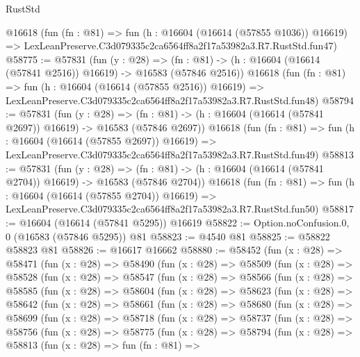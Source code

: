\begin{lexlean}{RustStd}
\begin{coremodule}
    @16618
    (fun (fn : @81) =>
    fun (h : @16604 (@16614 (@57855 @1036)) @16619) =>
    LexLeanPreserve.C3d079335c2ca6564ff8a2f17a53982a3.R7.RustStd.fun47)
@58775 := @57831
    (fun (y : @28) =>
    (fn : @81) -> (h : @16604 (@16614 (@57841 @2516)) @16619) -> @16583 (@57846 @2516))
    @16618
    (fun (fn : @81) =>
    fun (h : @16604 (@16614 (@57855 @2516)) @16619) =>
    LexLeanPreserve.C3d079335c2ca6564ff8a2f17a53982a3.R7.RustStd.fun48)
@58794 := @57831
    (fun (y : @28) =>
    (fn : @81) -> (h : @16604 (@16614 (@57841 @2697)) @16619) -> @16583 (@57846 @2697))
    @16618
    (fun (fn : @81) =>
    fun (h : @16604 (@16614 (@57855 @2697)) @16619) =>
    LexLeanPreserve.C3d079335c2ca6564ff8a2f17a53982a3.R7.RustStd.fun49)
@58813 := @57831
    (fun (y : @28) =>
    (fn : @81) -> (h : @16604 (@16614 (@57841 @2704)) @16619) -> @16583 (@57846 @2704))
    @16618
    (fun (fn : @81) =>
    fun (h : @16604 (@16614 (@57855 @2704)) @16619) =>
    LexLeanPreserve.C3d079335c2ca6564ff8a2f17a53982a3.R7.RustStd.fun50)
@58817 := @16604 (@16614 (@57841 @5295)) @16619
@58822 := Option.noConfusion.{0, 0} (@16583 (@57846 @5295)) @81
@58823 := @4540 @81
@58825 := @58822 @58823 @81
@58826 := @16617 @16662
@58880 := @58452
    (fun (x : @28) =>
    @58471
      (fun (x : @28) =>
      @58490
        (fun (x : @28) =>
        @58509
          (fun (x : @28) =>
          @58528
            (fun (x : @28) =>
            @58547
              (fun (x : @28) =>
              @58566
                (fun (x : @28) =>
                @58585
                  (fun (x : @28) =>
                  @58604
                    (fun (x : @28) =>
                    @58623
                      (fun (x : @28) =>
                      @58642
                        (fun (x : @28) =>
                        @58661
                          (fun (x : @28) =>
                          @58680
                            (fun (x : @28) =>
                            @58699
                              (fun (x : @28) =>
                              @58718
                                (fun (x : @28) =>
                                @58737
                                  (fun (x : @28) =>
                                  @58756
                                    (fun (x : @28) =>
                                    @58775
                                      (fun (x : @28) =>
                                      @58794
                                        (fun (x : @28) =>
                                        @58813
                                          (fun (x : @28) =>
                                          fun (fn : @81) =>

\end{coremodule}
\end{lexlean}
